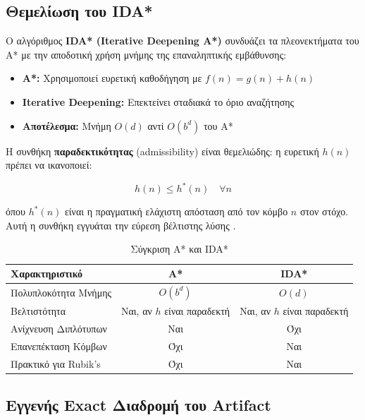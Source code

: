 \subsection{Θεμελίωση του IDA*}

Ο αλγόριθμος \textbf{IDA* (Iterative Deepening A*)} \cite{korf1985depth} συνδυάζει τα πλεονεκτήματα του A* με την αποδοτική χρήση μνήμης της επαναληπτικής εμβάθυνσης:

\begin{itemize}
    \item \textbf{A*:} Χρησιμοποιεί ευρετική καθοδήγηση με $f(n) = g(n) + h(n)$
    \item \textbf{Iterative Deepening:} Επεκτείνει σταδιακά το όριο αναζήτησης
    \item \textbf{Αποτέλεσμα:} Μνήμη $O(d)$ αντί $O(b^d)$ του A*
\end{itemize}

Η συνθήκη \textbf{παραδεκτικότητας} (admissibility) είναι θεμελιώδης: η ευρετική $h(n)$ πρέπει να ικανοποιεί:

\begin{equation}
h(n) \leq h^*(n) \quad \forall n
\end{equation}

όπου $h^*(n)$ είναι η πραγματική ελάχιστη απόσταση από τον κόμβο $n$ στον στόχο. Αυτή η συνθήκη εγγυάται την εύρεση βέλτιστης λύσης \cite{hart1968formal,korf1985depth}.

\begin{table}[htbp]
\centering
\caption{Σύγκριση A* και IDA*}
\label{tab:astar_vs_idastar}
\begin{tabular}{|l|c|c|}
\hline
\textbf{Χαρακτηριστικό} & \textbf{A*} & \textbf{IDA*} \\
\hline
Πολυπλοκότητα Μνήμης & $O(b^d)$ & $O(d)$ \\
Βελτιστότητα & Ναι, αν $h$ είναι παραδεκτή & Ναι, αν $h$ είναι παραδεκτή \\
Ανίχνευση Διπλότυπων & Ναι & Όχι \\
Επανεπέκταση Κόμβων & Όχι & Ναι \\
Πρακτικό για Rubik's & Όχι & Ναι \\
\hline
\end{tabular}
\end{table}

\subsection{Εγγενής Exact Διαδρομή του Artifact}

